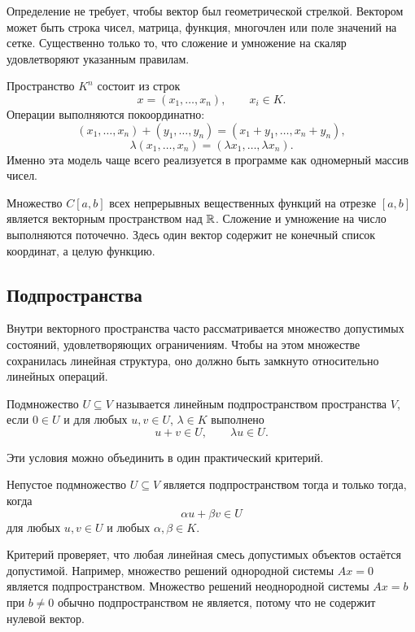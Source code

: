 Определение не требует, чтобы вектор был геометрической стрелкой. Вектором может быть строка чисел, матрица, функция, многочлен или поле значений на сетке. Существенно только то, что сложение и умножение на скаляр удовлетворяют указанным правилам.

\begin{example}
Пространство \(K^n\) состоит из строк
\[
x=(x_1,\dots,x_n),
\qquad x_i\in K.
\]
Операции выполняются покоординатно:
\[
(x_1,\dots,x_n)+(y_1,\dots,y_n)
=(x_1+y_1,\dots,x_n+y_n),
\]
\[
\lambda(x_1,\dots,x_n)
=(\lambda x_1,\dots,\lambda x_n).
\]
Именно эта модель чаще всего реализуется в программе как одномерный массив чисел.
\end{example}

\begin{example}
Множество \(C[a,b]\) всех непрерывных вещественных функций на отрезке \([a,b]\) является векторным пространством над \(\mathbb{R}\). Сложение и умножение на число выполняются поточечно. Здесь один вектор содержит не конечный список координат, а целую функцию.
\end{example}

\subsection{Подпространства}

Внутри векторного пространства часто рассматривается множество допустимых состояний, удовлетворяющих ограничениям. Чтобы на этом множестве сохранилась линейная структура, оно должно быть замкнуто относительно линейных операций.

\begin{definition}
Подмножество \(U\subseteq V\) называется линейным подпространством пространства \(V\), если \(0\in U\) и для любых \(u,v\in U\), \(\lambda\in K\) выполнено
\[
u+v\in U,
\qquad
\lambda u\in U.
\]
\end{definition}

Эти условия можно объединить в один практический критерий.

\begin{criterion}
Непустое подмножество \(U\subseteq V\) является подпространством тогда и только тогда, когда
\[
\alpha u+\beta v\in U
\]
для любых \(u,v\in U\) и любых \(\alpha,\beta\in K\).
\end{criterion}

Критерий проверяет, что любая линейная смесь допустимых объектов остаётся допустимой. Например, множество решений однородной системы \(Ax=0\) является подпространством. Множество решений неоднородной системы \(Ax=b\) при \(b\neq 0\) обычно подпространством не является, потому что не содержит нулевой вектор.

